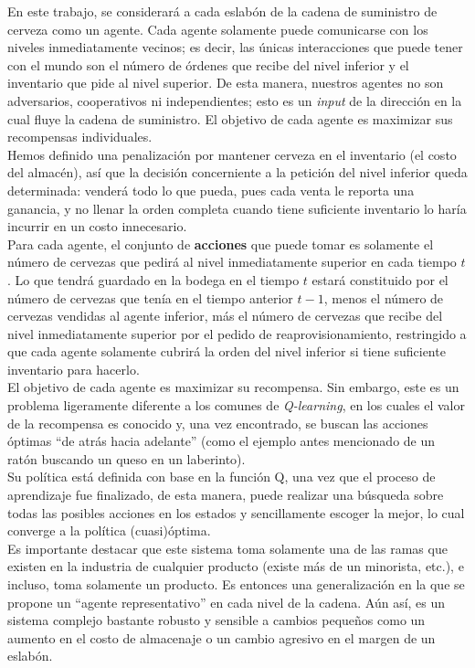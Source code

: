En este trabajo, se considerar\'a a cada eslab\'on de la cadena de suministro de cerveza como un agente. Cada agente solamente puede comunicarse con los niveles inmediatamente vecinos; es decir, las \'unicas interacciones que puede tener con el mundo son el n\'umero de \'ordenes que recibe del nivel inferior y el inventario que pide al nivel superior. De esta manera, nuestros agentes no son adversarios, cooperativos ni independientes; esto es un \textit{input} de la direcci\'on en la cual fluye la cadena de suministro. El objetivo de cada agente es maximizar sus recompensas individuales.\\

Hemos definido una penalizaci\'on por mantener cerveza en el inventario (el costo del almac\'en), as\'i que la decisi\'on concerniente a la petici\'on del nivel inferior queda determinada: vender\'a todo lo que pueda, pues cada venta le reporta una ganancia, y no llenar la orden completa cuando tiene suficiente inventario lo har\'ia incurrir en un costo innecesario.\\

Para cada agente, el conjunto de \textbf{acciones} que puede tomar es solamente el n\'umero de cervezas que pedir\'a al nivel inmediatamente superior en cada tiempo $t$. Lo que tendr\'a guardado en la bodega en el tiempo $t$ estar\'a constituido por el n\'umero de cervezas que ten\'ia en el tiempo anterior $t-1$, menos el n\'umero de cervezas vendidas al agente inferior, m\'as el n\'umero de cervezas que recibe del nivel inmediatamente superior por el pedido de reaprovisionamiento, restringido a que cada agente solamente cubrir\'a la orden del nivel inferior si tiene suficiente inventario para hacerlo.\\

El objetivo de cada agente es maximizar su recompensa. Sin embargo, este es un problema ligeramente diferente a los comunes de \textit{Q-learning}, en los cuales el valor de la recompensa es conocido y, una vez encontrado, se buscan las acciones \'optimas ``de atr\'as hacia adelante'' (como el ejemplo antes mencionado de un rat\'on buscando un queso en un laberinto).\\

Su pol\'itica est\'a definida con base en la funci\'on Q, una vez que el proceso de aprendizaje fue finalizado, de esta manera, puede realizar una b\'usqueda sobre todas las posibles acciones en los estados y sencillamente escoger la mejor, lo cual converge a la pol\'itica (cuasi)\'optima. \\

Es importante destacar que este sistema toma solamente una de las ramas que existen en la industria de cualquier producto (existe m\'as de un minorista, etc.), e incluso, toma solamente un producto. Es entonces una generalizaci\'on en la que se propone un ``agente representativo'' en cada nivel de la cadena. A\'un as\'i, es un sistema complejo bastante robusto y sensible a cambios peque\~nos como un aumento en el costo de almacenaje o un cambio agresivo en el margen de un eslab\'on.

